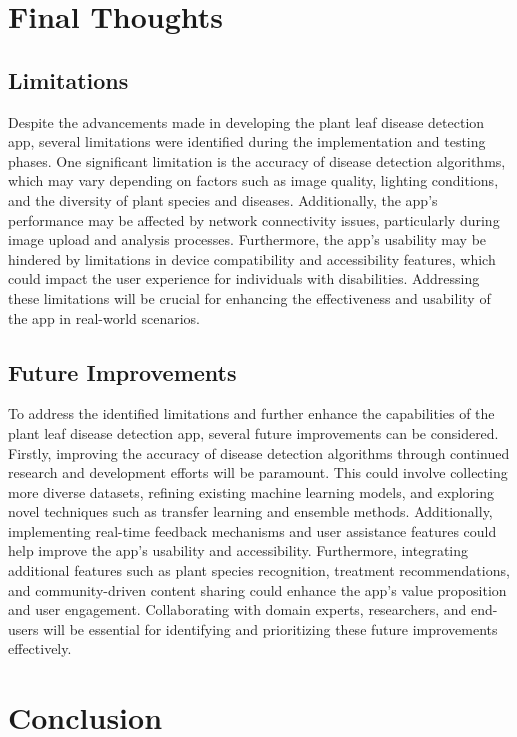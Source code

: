 \documentclass{article}
\begin{document}
\section{Final Thoughts}

\subsection{Limitations}

Despite the advancements made in developing the plant leaf disease detection app, several limitations were identified during the implementation and testing phases. One significant limitation is the accuracy of disease detection algorithms, which may vary depending on factors such as image quality, lighting conditions, and the diversity of plant species and diseases. Additionally, the app's performance may be affected by network connectivity issues, particularly during image upload and analysis processes. Furthermore, the app's usability may be hindered by limitations in device compatibility and accessibility features, which could impact the user experience for individuals with disabilities. Addressing these limitations will be crucial for enhancing the effectiveness and usability of the app in real-world scenarios.

\subsection{Future Improvements}

To address the identified limitations and further enhance the capabilities of the plant leaf disease detection app, several future improvements can be considered. Firstly, improving the accuracy of disease detection algorithms through continued research and development efforts will be paramount. This could involve collecting more diverse datasets, refining existing machine learning models, and exploring novel techniques such as transfer learning and ensemble methods. Additionally, implementing real-time feedback mechanisms and user assistance features could help improve the app's usability and accessibility. Furthermore, integrating additional features such as plant species recognition, treatment recommendations, and community-driven content sharing could enhance the app's value proposition and user engagement. Collaborating with domain experts, researchers, and end-users will be essential for identifying and prioritizing these future improvements effectively.

\section{Conclusion}
\end{document}
